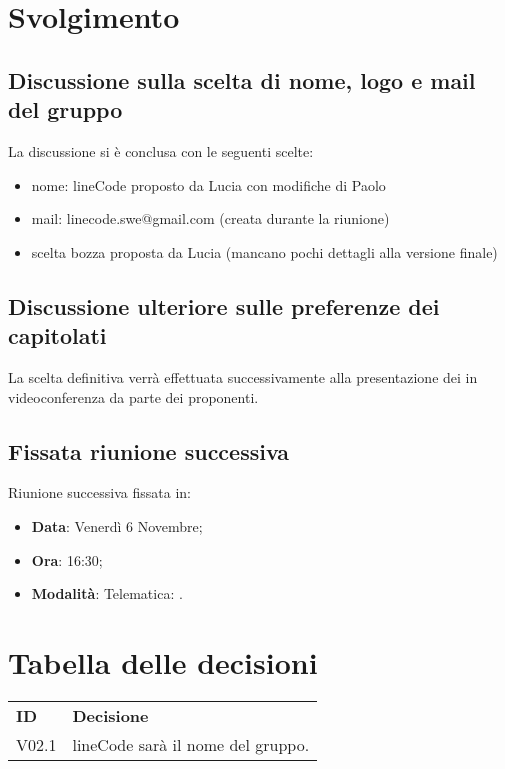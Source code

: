 \documentclass[]{article}
\begin{document}
	\newpage

	\section{Svolgimento}
		\subsection{Discussione sulla scelta di nome, logo e mail del gruppo}
		La discussione si è conclusa con le seguenti scelte:
		\begin{itemize}
				\item nome: lineCode proposto da Lucia con modifiche di Paolo
				\item mail: linecode.swe@gmail.com (creata durante la riunione)
				\item scelta bozza proposta da Lucia (mancano pochi dettagli
	      	      alla versione finale)\\
			\end{itemize}
	      	      
		\subsection{Discussione ulteriore sulle preferenze dei capitolati}
		La scelta definitiva verrà effettuata successivamente alla
	    presentazione dei  in videoconferenza da parte dei proponenti.\\

		\subsection{Fissata riunione successiva}
		Riunione successiva fissata in:
		\begin{itemize}
			\item \textbf{Data}: Venerdì 6 Novembre;
			\item \textbf{Ora}: 16:30;
			\item \textbf{Modalità}: Telematica: .
		\end{itemize}
	
	\newpage
	
	\section{Tabella delle decisioni}
	
	\begin{table} [h!]
		\begin{center}
			\begin{tabular} { m{2cm} m{14cm} }
				\rowcolor{lightgray}
				\textbf{ID} & \textbf{Decisione}\\
				V02.1 & lineCode sarà il nome del gruppo.\\
			\end{tabular}
		\end{center}
	\end{table}
\end{document}
